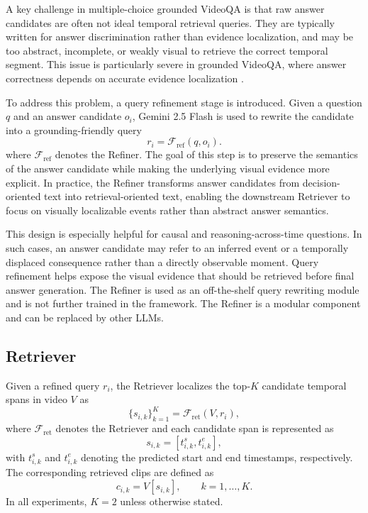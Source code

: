 A key challenge in multiple-choice grounded VideoQA is that raw answer candidates are often not ideal temporal retrieval queries. They are typically written for answer discrimination rather than evidence localization, and may be too abstract, incomplete, or weakly visual to retrieve the correct temporal segment. This issue is particularly severe in grounded VideoQA, where answer correctness depends on accurate evidence localization \cite{xiao2024can,chen2024rextime}.

To address this problem, a query refinement stage is introduced. Given a question $q$ and an answer candidate $o_i$, Gemini 2.5 Flash is used to rewrite the candidate into a grounding-friendly query
\begin{equation}
r_i = \mathcal{F}_{\text{ref}}(q, o_i).
\end{equation}
\noindent where $\mathcal{F}_{\text{ref}}$ denotes the Refiner. The goal of this step is to preserve the semantics of the answer candidate while making the underlying visual evidence more explicit. In practice, the Refiner transforms answer candidates from decision-oriented text into retrieval-oriented text, enabling the downstream Retriever to focus on visually localizable events rather than abstract answer semantics.

This design is especially helpful for causal and reasoning-across-time questions. In such cases, an answer candidate may refer to an inferred event or a temporally displaced consequence rather than a directly observable moment. Query refinement helps expose the visual evidence that should be retrieved before final answer generation. The Refiner is used as an off-the-shelf query rewriting module and is not further trained in the framework. The Refiner is a modular component and can be replaced by other LLMs.

\subsection{Retriever}
\label{sec:retriever}

Given a refined query $r_i$, the Retriever localizes the top-$K$ candidate temporal spans in video $V$ as
\begin{equation}
\{s_{i,k}\}_{k=1}^{K} = \mathcal{F}_{\text{ret}}(V, r_i),
\end{equation}
where $\mathcal{F}_{\text{ret}}$ denotes the Retriever and each candidate span is represented as
\begin{equation}
s_{i,k} = [t^{s}_{i,k}, t^{e}_{i,k}],
\end{equation}
with $t^{s}_{i,k}$ and $t^{e}_{i,k}$ denoting the predicted start and end timestamps, respectively. The corresponding retrieved clips are defined as
\begin{equation}
c_{i,k} = V[s_{i,k}], \qquad k = 1, \dots, K.
\end{equation}
In all experiments, $K=2$ unless otherwise stated.

